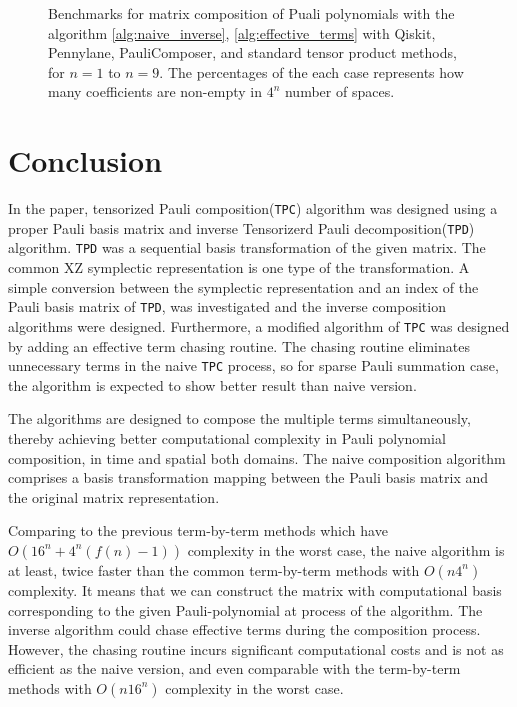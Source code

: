 \documentclass[twocolumn]{article}
\begin{document}
\begin{figure*}[ht]
    \centering
    \hfil
    
    \hfil
    
    \caption{Benchmarks for matrix composition of Puali polynomials with the algorithm \ref{alg:naive_inverse}, \ref{alg:effective_terms} with 
    Qiskit, Pennylane, PauliComposer, and standard tensor product methods, for $n=1$ to $n=9$. 
    The percentages of the each case represents how many coefficients are non-empty in $4^n$ number of spaces.}
        \label{fig:results}
\end{figure*}

\section{Conclusion}

In the paper, tensorized Pauli composition(\texttt{TPC}) algorithm was designed 
using a proper Pauli basis matrix and inverse Tensorizerd Pauli decomposition(\texttt{TPD}) algorithm\cite{Hantzko_2024}.
\texttt{TPD} was a sequential basis transformation of the given matrix.
The common XZ symplectic representation is one type of the transformation.
A simple conversion between the symplectic representation and an index of the Pauli basis matrix of \texttt{TPD}, 
was investigated and the inverse composition algorithms were designed.
Furthermore, a modified algorithm of \texttt{TPC} was designed by adding an effective term chasing routine.  
The chasing routine eliminates unnecessary terms in the naive \texttt{TPC} process,
so for sparse Pauli summation case, the algorithm is expected to show better result than naive version.

The algorithms are designed to compose the multiple terms simultaneously, thereby achieving better computational complexity in Pauli polynomial composition, in time and spatial both domains. 
The naive composition algorithm comprises a basis transformation mapping between the Pauli basis matrix and the original matrix representation.

Comparing to the previous term-by-term methods which have $O(16^n + 4^n(f(n)-1))$ complexity in the worst case, 
the naive algorithm is at least, twice faster than the common term-by-term methods  with $O(n4^n)$ complexity. 
It means that we can construct the matrix with computational basis corresponding to the given 
Pauli-polynomial at process of the algorithm. 
The inverse algorithm could chase effective terms during the composition process. 
However, the chasing routine incurs significant computational costs and is not as efficient as the naive version,
and even comparable with the term-by-term methods with $O(n16^n)$ complexity in the worst case.
\end{document}
